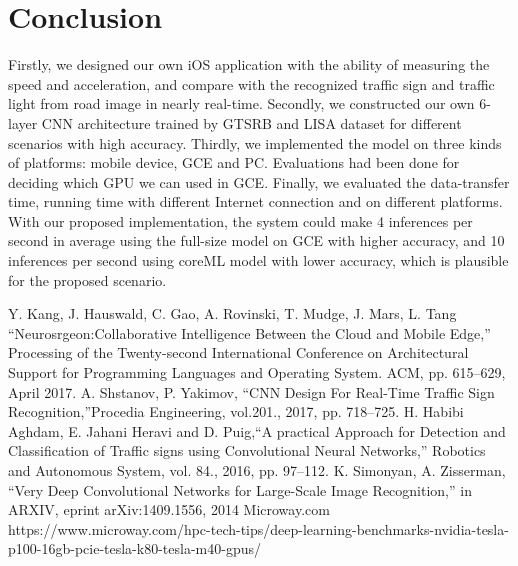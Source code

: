 \documentclass[conference]{IEEEtran}
\begin{document}
\section{Conclusion}
Firstly, we designed our own iOS application with the ability of measuring the speed and acceleration, and compare with the recognized traffic sign and traffic light from road image in nearly real-time. Secondly, we constructed our own 6-layer CNN architecture trained by GTSRB and LISA dataset for different scenarios with high accuracy. Thirdly, we implemented the model on three kinds of platforms: mobile device, GCE and PC. Evaluations had been done for deciding which GPU we can used in GCE. Finally, we evaluated the data-transfer time, running time with different Internet connection and on different platforms. With our proposed implementation, the system could make 4 inferences per second in average using the full-size model on GCE with higher accuracy, and 10 inferences per second using coreML model with lower accuracy, which is plausible for the proposed scenario.

\begin{thebibliography}{00}
 Y. Kang, J. Hauswald, C. Gao, A. Rovinski, T. Mudge, J. Mars, L. Tang ``Neurosrgeon:Collaborative Intelligence Between the Cloud and Mobile Edge,'' Processing of the Twenty-second International Conference on Architectural Support for Programming Languages and Operating System. ACM, pp. 615--629, April 2017.
 A. Shstanov, P. Yakimov, ``CNN Design For Real-Time Traffic Sign Recognition,''Procedia Engineering, vol.201., 2017, pp. 718--725.
 H. Habibi Aghdam, E. Jahani Heravi and D. Puig,``A practical Approach for Detection and Classification of Traffic signs using Convolutional Neural Networks,'' Robotics and Autonomous System, vol. 84., 2016, pp. 97--112.
 K. Simonyan, A. Zisserman, ``Very Deep Convolutional Networks for Large-Scale Image Recognition,'' in ARXIV, eprint arXiv:1409.1556, 2014
 Microway.com https://www.microway.com/hpc-tech-tips/deep-learning-benchmarks-nvidia-tesla-p100-16gb-pcie-tesla-k80-tesla-m40-gpus/
\end{thebibliography}
\end{document}
